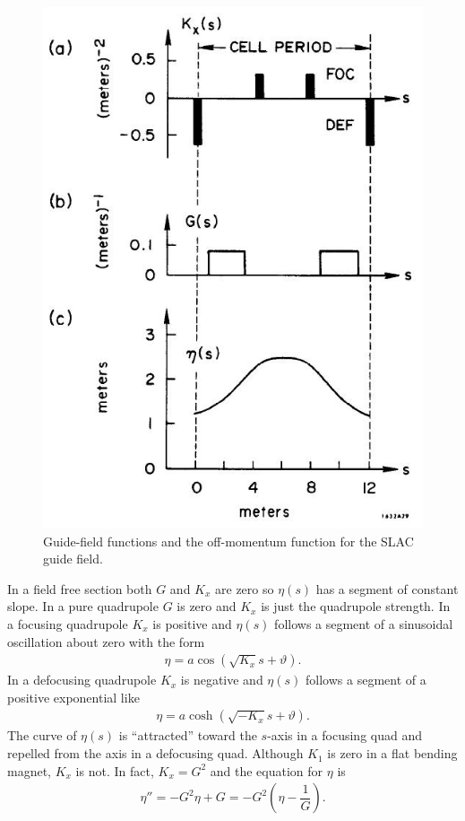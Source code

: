 \begin{figure}[!htb]
	\centering
	\includegraphics[width=0.8\linewidth]{./Figuras/fig29.jpeg}
	\caption{Guide-field functions and the off-momentum function for the SLAC guide field.}
	\label{fig:fig29}
\end{figure}
In a field free section both $G$ and $K_x$ are zero so $\eta(s)$ has a segment of constant
slope. In a pure quadrupole $G$ is zero and $K_x$ is just the quadrupole strength. In
a focusing quadrupole $K_x$ is positive and $\eta(s)$ follows a segment of a sinusoidal
oscillation about zero with the form
\begin{align*}
	\eta = a \cos(\sqrt{K_x}s + \vartheta).
\end{align*}
In a defocusing quadrupole $K_x$ is negative and $\eta(s)$ follows a segment of a positive
exponential like
\begin{align*}
	\eta = a \cosh(\sqrt{-K_x}s+\vartheta).
\end{align*}
The curve of $\eta(s)$ is ``attracted'' toward the $s$-axis in a focusing quad and repelled
from the axis in a defocusing quad.
Although $K_1$ is zero in a flat bending magnet, $K_x$ is not. In fact, $K_x = G^2$ and
the equation for $\eta$ is
\begin{align}
	\eta'' = -G^2\eta + G = -G^2\left( \eta - \dfrac{1}{G} \right).
\end{align}
